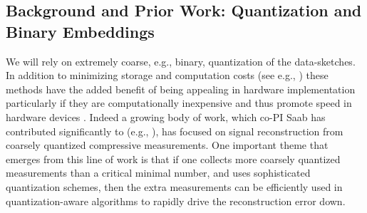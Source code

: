 

\subsection{Background and Prior Work: Quantization and Binary Embeddings}
We will rely on extremely
coarse, e.g., binary, quantization of the data-sketches. In addition to minimizing storage and computation costs (see e.g., \cite{fang2014sparse,boufounos20081}) these methods have the added benefit of being appealing in hardware implementation particularly if they are computationally inexpensive and thus promote speed in hardware devices  \cite{jacques2013robust,le2005analog}. Indeed a growing body of work, which co-PI Saab has contributed significantly to (e.g., \cite{SaabIEEEIT,knudson2016one,saab2018quantization,LybrandSaab2018,iwen2019new}), has focused on signal reconstruction from coarsely quantized compressive measurements. One important theme that emerges from this line of work  is that if one collects more coarsely quantized measurements than a critical minimal number, and uses sophisticated quantization schemes, then the extra measurements can be efficiently used in quantization-aware algorithms to rapidly drive the reconstruction error down.

